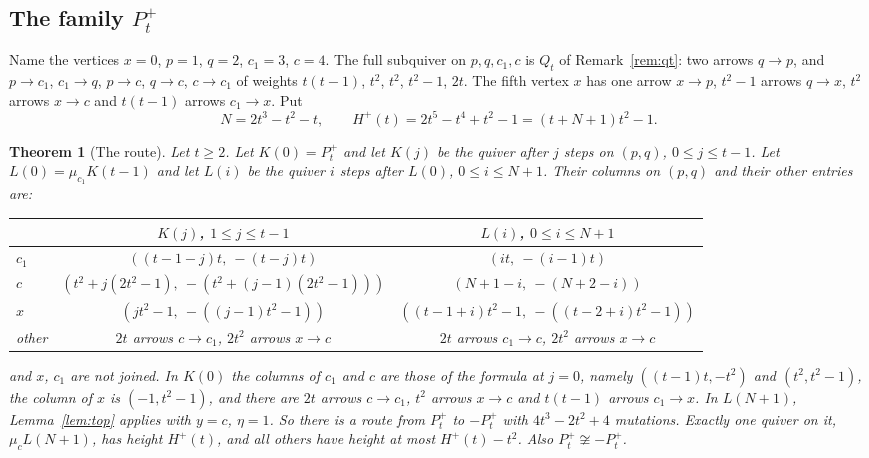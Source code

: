 \documentclass[11pt]{amsart}
\newtheorem{theorem}{Theorem}[section]
\theoremstyle{definition}
\theoremstyle{remark}
\begin{document}
\subsection{The family \texorpdfstring{$P^+_t$}{P+\_t}}\label{sec:pt}
Name the vertices $x=0$, $p=1$, $q=2$, $c_1=3$, $c=4$. The full subquiver on $p,q,c_1,c$ is $Q_t$ of Remark~\ref{rem:qt}: two arrows $q\to p$, and $p\to c_1$, $c_1\to q$, $p\to c$, $q\to c$, $c\to c_1$ of weights $t(t-1)$, $t^2$, $t^2$, $t^2-1$, $2t$. The fifth vertex $x$ has one arrow $x\to p$, $t^2-1$ arrows $q\to x$, $t^2$ arrows $x\to c$ and $t(t-1)$ arrows $c_1\to x$. Put
\[N=2t^3-t^2-t,\qquad H^+(t)=2t^5-t^4+t^2-1=(t+N+1)t^2-1.\]

\begin{theorem}[The route]\label{thm:ptroute}
Let $t\ge2$. Let $K(0)=P^+_t$ and let $K(j)$ be the quiver after $j$ steps on $(p,q)$, $0\le j\le t-1$. Let $L(0)=\mu_{c_1}K(t-1)$ and let $L(i)$ be the quiver $i$ steps after $L(0)$, $0\le i\le N+1$. Their columns on $(p,q)$ and their other entries are:
\begin{center}\small
\begin{tabular}{lcc}
\toprule
 & $K(j)$, $1\le j\le t-1$ & $L(i)$, $0\le i\le N+1$\\
\midrule
$c_1$ & $((t-1-j)t,\ -(t-j)t)$ & $(it,\ -(i-1)t)$\\
$c$ & $(t^2+j(2t^2-1),\ -(t^2+(j-1)(2t^2-1)))$ & $(N+1-i,\ -(N+2-i))$\\
$x$ & $(jt^2-1,\ -((j-1)t^2-1))$ & $((t-1+i)t^2-1,\ -((t-2+i)t^2-1))$\\
other & $2t$ arrows $c\to c_1$, $2t^2$ arrows $x\to c$ & $2t$ arrows $c_1\to c$, $2t^2$ arrows $x\to c$\\
\bottomrule
\end{tabular}
\end{center}
and $x$, $c_1$ are not joined. In $K(0)$ the columns of $c_1$ and $c$ are those of the formula at $j=0$, namely $((t-1)t,-t^2)$ and $(t^2,t^2-1)$, the column of $x$ is $(-1,t^2-1)$, and there are $2t$ arrows $c\to c_1$, $t^2$ arrows $x\to c$ and $t(t-1)$ arrows $c_1\to x$. In $L(N+1)$, Lemma~\ref{lem:top} applies with $y=c$, $\eta=1$. So there is a route from $P^+_t$ to $-P^+_t$ with $4t^3-2t^2+4$ mutations. Exactly one quiver on it, $\mu_c L(N+1)$, has height $H^+(t)$, and all others have height at most $H^+(t)-t^2$. Also $P^+_t\not\cong-P^+_t$.
\end{theorem}
\end{document}
